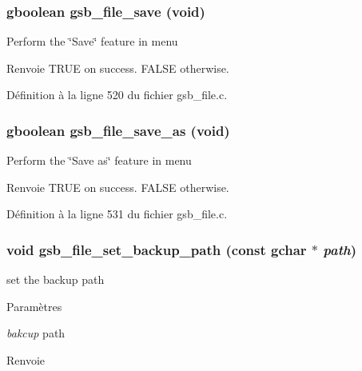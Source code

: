 \subsubsection[{gsb\_\-file\_\-save}]{\setlength{\rightskip}{0pt plus 5cm}gboolean gsb\_\-file\_\-save (void)}\label{gsb__file_8h_a986804bbb7d965c1f15c325de610a7ef}
Perform the \char`\"{}Save\char`\"{} feature in menu

\begin{DoxyReturn}{Renvoie}
TRUE on success. FALSE otherwise. 
\end{DoxyReturn}


Définition à la ligne 520 du fichier gsb\_\-file.c.

\subsubsection[{gsb\_\-file\_\-save\_\-as}]{\setlength{\rightskip}{0pt plus 5cm}gboolean gsb\_\-file\_\-save\_\-as (void)}\label{gsb__file_8h_ac88aac4aa8b7ad7c91d5703b36c08eed}
Perform the \char`\"{}Save as\char`\"{} feature in menu

\begin{DoxyReturn}{Renvoie}
TRUE on success. FALSE otherwise. 
\end{DoxyReturn}


Définition à la ligne 531 du fichier gsb\_\-file.c.

\subsubsection[{gsb\_\-file\_\-set\_\-backup\_\-path}]{\setlength{\rightskip}{0pt plus 5cm}void gsb\_\-file\_\-set\_\-backup\_\-path (const gchar $\ast$ {\em path})}\label{gsb__file_8h_a69328a78586ad0fc193072ffc634e1f4}
set the backup path


\begin{DoxyParams}{Paramètres}
\item[{\em bakcup}]path\end{DoxyParams}
\begin{DoxyReturn}{Renvoie}

\end{DoxyReturn}


